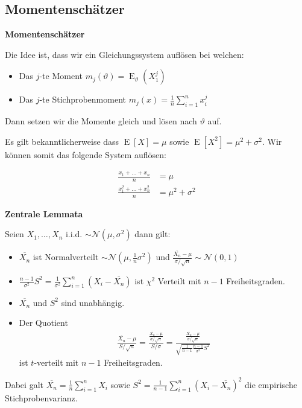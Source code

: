 \documentclass[25pt]{sciposter}
\newcommand{\E}{\operatorname{E}}
\newenvironment{method}[1]{\begin{mdframed}[backgroundcolor=blue!10,innertopmargin=15pt, innerbottommargin=15pt,nobreak=true]
		\textbf{#1 }
	}
	{ 
	\end{mdframed}
}
\newenvironment{thm}[1]{\begin{mdframed}[backgroundcolor=pink!20,innertopmargin=15pt, innerbottommargin=15pt, nobreak=true]
		\textbf{#1 }
	}
	{ 
	\end{mdframed}
}
\begin{document}
\begin{multicols}{3}
		\subsection*{Momentenschätzer}
		
		\begin{method}{Momentenschätzer}
			
			Die Idee ist, dass wir ein Gleichungssystem auflösen bei welchen:
			\begin{itemize}
				\item Das $j$-te Moment ${\displaystyle m_{j}(\vartheta )=\operatorname {E} _{\vartheta }(X_{1}^{j})}$
				\item Das $j$-te Stichprobenmoment ${\displaystyle m_{j}(x)={\frac {1}{n}}\sum _{i=1}^{n}x_{i}^{j}}$
			\end{itemize}
			
			Dann setzen wir die Momente gleich und lösen nach $\vartheta$ auf.
			
		\end{method}
		
		Es gilt bekanntlicherweise dass $\E[X] = \mu$ sowie $\E[X^2] = \mu^2 + \sigma^2$. Wir können somit das folgende System auflösen:
		
		\begin{align*}
			\frac{x_1 + \ldots + x_n}{n} &= \mu\\
			\frac{x_1^2 + \ldots + x_n^2}{n} &= \mu^2 + \sigma ^2
		\end{align*}
		
		
		
		\begin{thm}{Zentrale Lemmata}
			Seien $X_1,\ldots, X_n$ i.i.d. $\sim \mathcal{N}(\mu,\sigma^2)$ dann gilt:
			
			\begin{itemize}
				\item $\overline{X_n}$ ist Normalverteilt $\sim \mathcal{N}(\mu,\frac{1}{n}\sigma^2)$ und $\frac{\overline{X_n} - \mu}{\sigma / \sqrt{n}} \sim \mathcal{N}(0,1)$
				\item $\frac{n-1}{\sigma^2}S^2 = \frac{1}{\sigma^2}\sum_{i=1}^{n}(X_i - \overline{X_n})$ ist $\chi^2$ Verteilt mit $n-1$ Freiheitsgraden.
				\item $\overline{X_n}$ und $S^2$ sind unabhängig.
				\item Der Quotient
				\begin{align*}
					\frac{\overline{X_n}-\mu}{S/\sqrt{n}} = \frac{\frac{\overline{X_n} - \mu}{\sigma / \sqrt{n}}}{S/\sigma} = \frac{\frac{\overline{X_n} - \mu}{\sigma / \sqrt{n}}}{\sqrt{\frac{1}{n-1} \frac{n-1}{\sigma^2} S^2}}
				\end{align*}
				ist $t$-verteilt mit $n-1$ Freiheitsgraden.
			\end{itemize}
			Dabei galt $\overline{X_n} = \frac{1}{n}\sum_{i=1}^{n} X_i$ sowie $S^2 = \frac{1}{n-1} \sum_{i=1}^{n} (X_i -\overline{X_n})^2$ die empirische Stichprobenvarianz.
		\end{thm}
		

\end{multicols}
\end{document}
